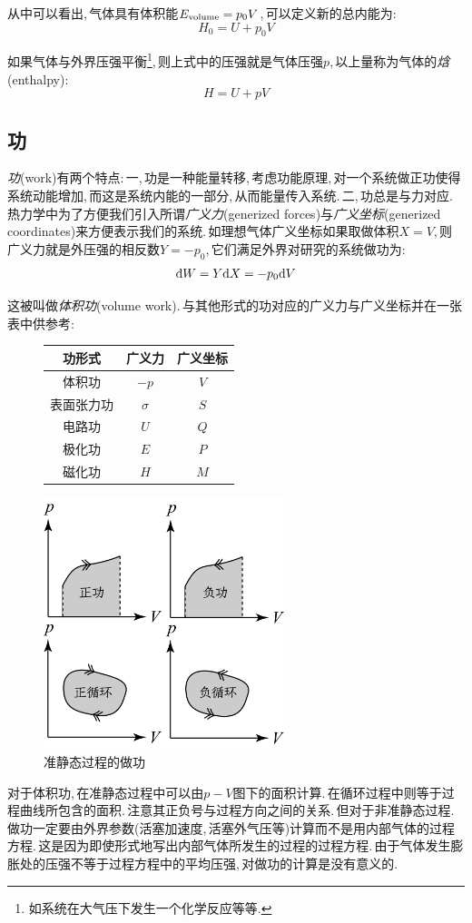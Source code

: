 从中可以看出,\,气体具有体积能$E_{\rm volume}=p_0 V$,\,可以定义新的总内能为:
\[H_0=U+p_0 V\]

如果气体与外界压强平衡\footnote{如系统在大气压下发生一个化学反应等等.},\,则上式中的压强就是气体压强$p$,\,以上量称为气体的\emph{焓}(enthalpy):
\[H=U+pV\]


\subsection{功}
\emph{功}(work)有两个特点:\,一,\,功是一种能量转移,\,考虑功能原理,\,对一个系统做正功使得系统动能增加,\,而这是系统内能的一部分,\,从而能量传入系统.\,二,\,功总是与力对应.\,热力学中为了方便我们引入所谓\emph{广义力}(generized forces)与\emph{广义坐标}(generized coordinates)来方便表示我们的系统.\,如理想气体广义坐标如果取做体积$X=V$,\,则广义力就是外压强的相反数$Y=-p_0$,\,它们满足外界对研究的系统做功为:
\[\dbar W=Y\ud X=-p_0\ud V\]

这被叫做\emph{体积功}(volume work).\,与其他形式的功对应的广义力与广义坐标并在一张表中供参考:
\begin{figure}[H]
\centering
\begin{tabular}{c|c|c}
\hline
功形式		&	广义力					&	广义坐标			\\ \hline\hline
体积功		&	$-p$ 				&	$V$ 			\\ \hline
表面张力功  &	$\sigma$    		&   $S$ 		    \\ \hline
电路功		&   $U$ 				&   $Q$				\\ \hline
极化功		&	$E$ 				&  	$P$ 			\\ \hline
磁化功		&	$H$ 				& 	$M$ 			\\ \hline
\end{tabular}
\end{figure}

\begin{figure}
\centering
\vspace{-30pt}
\includegraphics[width=7cm]{image/5-1-1.png}
\caption{准静态过程的做功}
\end{figure}
对于体积功,\,在准静态过程中可以由$p-V$图下的面积计算.\,在循环过程中则等于过程曲线所包含的面积.\,注意其正负号与过程方向之间的关系.\,但对于非准静态过程.\,做功一定要由外界参数(活塞加速度,\,活塞外气压等)计算而不是用内部气体的过程方程.\,这是因为即使形式地写出内部气体所发生的过程的过程方程.\,由于气体发生膨胀处的压强不等于过程方程中的平均压强,\,对做功的计算是没有意义的.
